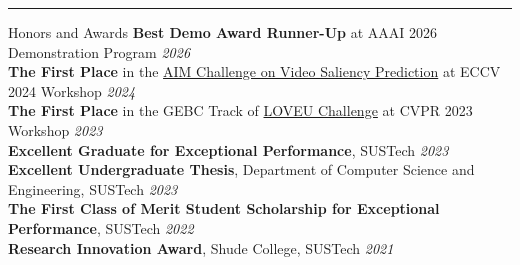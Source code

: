 \vspace{10pt}
\hrule
\begin{rSection}{Honors and Awards}
    \textbf{Best Demo Award Runner-Up} at AAAI 2026 Demonstration Program \hfill \textit{2026} \\[0.1cm]
    \textbf{The First Place} in the \href{https://challenges.videoprocessing.ai/challenges/video-saliency-prediction-leaderboard.html}{AIM Challenge on Video Saliency Prediction} at ECCV 2024 Workshop \hfill \textit{2024} \\[0.1cm]
    \textbf{The First Place} in the GEBC Track of \href{https://sites.google.com/view/loveucvpr23/home}{LOVEU Challenge} at CVPR 2023 Workshop \hfill \textit{2023} \\[0.1cm]
    \textbf{Excellent Graduate for Exceptional Performance}, SUSTech \hfill \textit{2023} \\[0.1cm]
    \textbf{Excellent Undergraduate Thesis}, Department of Computer Science and Engineering, SUSTech \hfill \textit{2023} \\[0.1cm]
    \textbf{The First Class of Merit Student Scholarship for Exceptional Performance}, SUSTech \hfill \textit{2022} \\[0.1cm]
    \textbf{Research Innovation Award}, Shude College, SUSTech \hfill \textit{2021}
\end{rSection}
